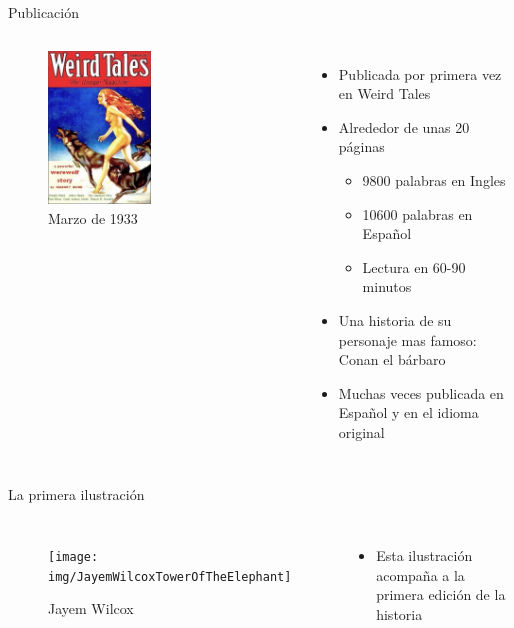 \begin{frame}{Publicación}
	\begin{columns}
		\begin{figure}[htb]
			\centering
			\includegraphics[width=0.5\textwidth]{img/WeirdTales-1933-03}
			\caption{Marzo de 1933}
		\end{figure}
		\begin{itemize}
			\item Publicada por primera vez en Weird Tales
			\item Alrededor de unas 20 páginas
			\begin{itemize}
				\item 9800 palabras en Ingles
				\item 10600 palabras en Español
				\item Lectura en 60-90 minutos
			\end{itemize}
			\item Una historia de su personaje mas famoso: Conan el bárbaro
			\item Muchas veces publicada en Español y en el idioma original
		\end{itemize}
	\end{columns}
\end{frame}
\note[itemize]{
	\item
}

\begin{frame}{La primera ilustración}
	\begin{columns}
		\column[t]{0.4\textwidth}
		\begin{figure}[htb]
			\centering
			\texttt{[image: img/JayemWilcoxTowerOfTheElephant]}
			\caption{Jayem Wilcox}
		\end{figure}
		\column[t]{0.6\textwidth}
		\begin{itemize}
			\item Esta ilustración acompaña a la primera edición de la historia
		\end{itemize}
	\end{columns}
\end{frame}
\note[itemize]{
	\item
}

